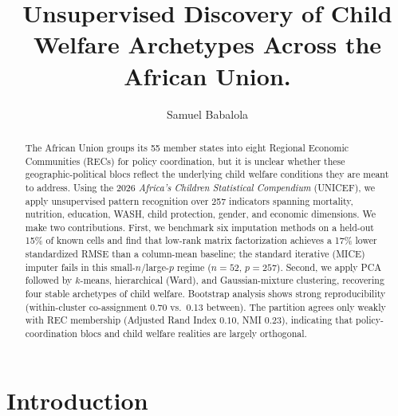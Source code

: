 \documentclass[runningheads]{llncs}
\begin{document}
\title{Unsupervised Discovery of Child Welfare Archetypes Across the African Union.}


\author{Samuel Babalola\inst{*}}


\maketitle

\begin{abstract}
The African Union groups its 55 member states into eight Regional Economic Communities (RECs) for policy coordination, but it is unclear whether these geographic-political blocs reflect the underlying child welfare conditions they are meant to address. Using the 2026 \emph{Africa's Children Statistical Compendium} (UNICEF), we apply unsupervised pattern recognition over 257 indicators spanning mortality, nutrition, education, WASH, child protection, gender, and economic dimensions. We make two contributions. First, we benchmark six imputation methods on a held-out 15\% of known cells and find that low-rank matrix factorization achieves a 17\% lower standardized RMSE than a column-mean baseline; the standard iterative (MICE) imputer fails in this small-$n$/large-$p$ regime ($n=52$, $p=257$). Second, we apply PCA followed by $k$-means, hierarchical (Ward), and Gaussian-mixture clustering, recovering four stable archetypes of child welfare. Bootstrap analysis shows strong reproducibility (within-cluster co-assignment 0.70 vs.\ 0.13 between). The partition agrees only weakly with REC membership (Adjusted Rand Index $0.10$, NMI $0.23$), indicating that policy-coordination blocs and child welfare realities are largely orthogonal.

\end{abstract}

\section{Introduction}\label{sec:intro}
\end{document}
